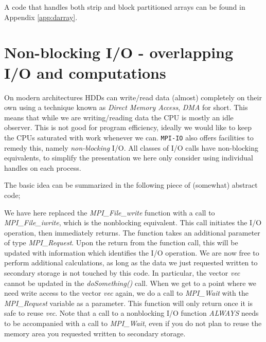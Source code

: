 \documentclass[twoside, 11pt, a4paper]{article}
\begin{document}
A code that handles both strip and block partitioned arrays can be found in
Appendix \ref{app:darray}.
\newpage
\section{Non-blocking I/O - overlapping I/O and computations}
On modern architectures HDDs can write/read data (almost) completely on their own
using a technique known as \emph{Direct Memory Access}, \emph{DMA} for short.
This means that while we are writing/reading data the CPU is mostly an idle
observer. This is not good for program efficiency, ideally we would like
to keep the CPUs saturated with work whenever we can.
\texttt{MPI-IO} also offers facilities to remedy this,
namely \emph{non-blocking} I/O. All classes of I/O calls have non-blocking
equivalents, to simplify the presentation we here only consider using
individual handles on each process.

The basic idea can be summarized in the following piece of (somewhat)
abstract code;

We have here replaced the \emph{MPI\_File\_write} function with a call
to \emph{MPI\_File\_iwrite}, which is the nonblocking equivalent. This
call initiates the I/O operation, then immediately returns. The function
takes an additional parameter of type \emph{MPI\_Request}. Upon the return
from the function call, this will be updated with information which 
identifies the I/O operation. We are now free to perform additional
calculations, as long as the data we just requested written to secondary 
storage is not touched by this code. In particular, the vector \emph{vec}
cannot be updated in the \emph{doSomething()} call. When we get to a point 
where we need write access to the vector \emph{vec} again, we do a call to 
\emph{MPI\_Wait} with the \emph{MPI\_Request} variable as a parameter.
This function will only return once it is safe to reuse \emph{vec}.
Note that a call to a nonblocking I/O function \emph{ALWAYS} needs
to be accompanied with a call to \emph{MPI\_Wait}, even if you
do not plan to reuse the memory area you requested written to secondary storage.
\newpage
\end{document}
